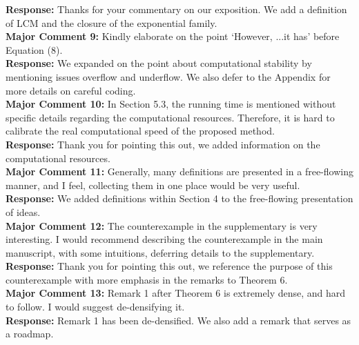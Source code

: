 \documentclass[12pt]{article}
\begin{document}
{\bf Response:} Thanks for your commentary on our exposition. We add a definition of LCM and the closure of the exponential family.  \\



{\bf Major Comment 9:} Kindly elaborate on the point ‘However, ...it has’ before Equation (8). \\

{\bf Response:} We expanded on the point about computational stability by mentioning issues overflow and underflow.  We also defer to the Appendix for more details on careful coding. \\



{\bf Major Comment 10:} In Section 5.3, the running time is mentioned without specific details regarding the computational resources. Therefore, it is hard to calibrate the real computational speed of the proposed method. \\

{\bf Response:} Thank you for pointing this out, we added information on the computational resources. \\



{\bf Major Comment 11:} Generally, many definitions are presented in a free-flowing manner, and I feel, collecting them in one place would be very useful. \\

{\bf Response:} We added definitions within Section 4 to the free-flowing presentation of ideas. \\



{\bf Major Comment 12:} The counterexample in the supplementary is very interesting. I would recommend describing the counterexample in the main manuscript, with some intuitions, deferring details to the supplementary. \\

{\bf Response:} Thank you for pointing this out, we reference the purpose of this counterexample with more emphasis in the remarks to Theorem 6. \\



{\bf Major Comment 13:} Remark 1 after Theorem 6 is extremely dense, and hard to follow. I would suggest de-densifying it. \\

{\bf Response:} Remark 1 has been de-densified. We also add a remark that serves as a roadmap. \\
\end{document}
